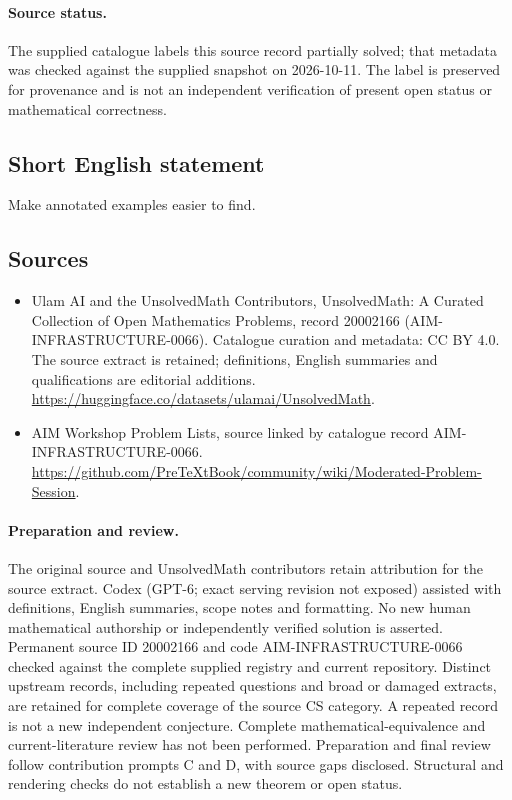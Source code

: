 \documentclass[11pt]{article}
\begin{document}
\paragraph{Source status.}
The supplied catalogue labels this source record partially solved; that metadata was checked against the supplied snapshot on 2026-10-11. The label is preserved for provenance and is not an independent verification of present open status or mathematical correctness.
\subsection{Short English statement}
Make annotated examples easier to find.
\subsection{Sources}
\begin{itemize}
\item[\hypertarget{source:20002166:1}{S1}] Ulam AI and the UnsolvedMath Contributors, UnsolvedMath: A Curated Collection of Open Mathematics Problems, record 20002166 (AIM-INFRASTRUCTURE-0066). Catalogue curation and metadata: CC BY 4.0. The source extract is retained; definitions, English summaries and qualifications are editorial additions.
\url{https://huggingface.co/datasets/ulamai/UnsolvedMath}.
\item[\hypertarget{source:20002166:2}{S2}] AIM Workshop Problem Lists, source linked by catalogue record AIM-INFRASTRUCTURE-0066.
\url{https://github.com/PreTeXtBook/community/wiki/Moderated-Problem-Session}.
\end{itemize}
\paragraph{Preparation and review.}
The original source and UnsolvedMath contributors retain attribution for the source extract. Codex (GPT-6; exact serving revision not exposed) assisted with definitions, English summaries, scope notes and formatting. No new human mathematical authorship or independently verified solution is asserted. Permanent source ID 20002166 and code AIM-INFRASTRUCTURE-0066 checked against the complete supplied registry and current repository. Distinct upstream records, including repeated questions and broad or damaged extracts, are retained for complete coverage of the source CS category. A repeated record is not a new independent conjecture. Complete mathematical-equivalence and current-literature review has not been performed. Preparation and final review follow contribution prompts C and D, with source gaps disclosed. Structural and rendering checks do not establish a new theorem or open status.
\label{end:20002166}
\end{document}
